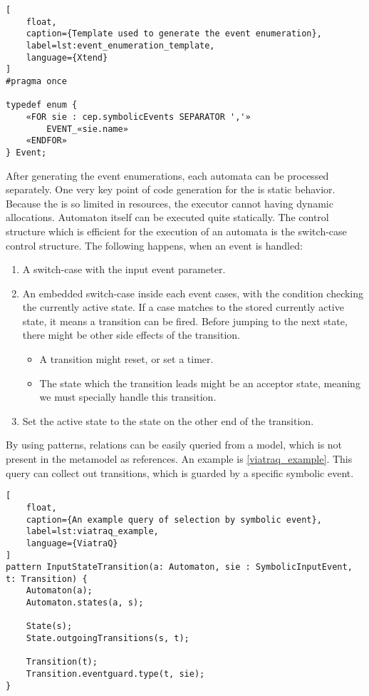 \begin{lstlisting}[
	float,
	caption={Template used to generate the event enumeration},
	label=lst:event_enumeration_template,
	language={Xtend}
]
#pragma once

typedef enum {
	«FOR sie : cep.symbolicEvents SEPARATOR ','»
		EVENT_«sie.name»
	«ENDFOR»
} Event;
\end{lstlisting}

\needspace{5ex}
After generating the event enumerations, each automata can be processed separately. One very key point of \cpp{} code generation for the \pru{} is static behavior. Because the \pru{} is so limited in resources, the executor cannot having dynamic allocations. Automaton itself can be executed quite statically. The control structure which is efficient for the execution of an automata is the switch-case control structure. The following happens, when an event is handled:
\begin{enumerate}
	\item A switch-case with the input event parameter.
	\item An embedded switch-case inside each event cases, with the condition checking the currently active state. If a case matches to the stored currently active state, it means a transition can be fired. Before jumping to the next state, there might be other side effects of the transition.
	\begin{itemize}
		\item A transition might reset, or set a timer.
		\item The state which the transition leads might be an acceptor state, meaning we must specially handle this transition.
	\end{itemize}
	\item Set the active state to the state on the other end of the transition.
\end{enumerate}

By using \viatraq{} patterns, relations can be easily queried from a model, which is not present in the metamodel as references. An example is \cref{viatraq_example}. This query can collect out transitions, which is guarded by a specific symbolic event.

\begin{lstlisting}[
	float,
	caption={An example query of selection by symbolic event},
	label=lst:viatraq_example,
	language={ViatraQ}
]
pattern InputStateTransition(a: Automaton, sie : SymbolicInputEvent, t: Transition) {
	Automaton(a);
	Automaton.states(a, s);

	State(s);
	State.outgoingTransitions(s, t);

	Transition(t);
	Transition.eventguard.type(t, sie);
}
\end{lstlisting}

